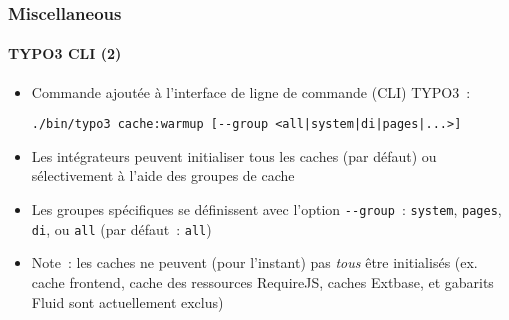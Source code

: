 %

\begin{frame}[fragile]
	\frametitle{Miscellaneous}
	\framesubtitle{TYPO3 CLI (2)}


	\begin{itemize}
		\item Commande ajoutée à l'interface de ligne de commande (CLI) TYPO3~:
\begin{lstlisting}
./bin/typo3 cache:warmup [--group <all|system|di|pages|...>]
\end{lstlisting}
		\item Les intégrateurs peuvent initialiser tous les caches (par défaut) ou sélectivement
			à l'aide des groupes de cache
		\item Les groupes spécifiques se définissent avec l'option
			\texttt{-}\texttt{-group}~:\newline
			\small\texttt{system}, \texttt{pages}, \texttt{di}, ou \texttt{all} (par défaut~: \texttt{all})\normalsize
		\item Note~: les caches ne peuvent (pour l'instant) pas \textit{tous} être initialisés\newline
			\small(ex. cache frontend, cache des ressources RequireJS, caches Extbase,
				et gabarits Fluid sont actuellement exclus)\normalsize
	\end{itemize}
\end{frame}

